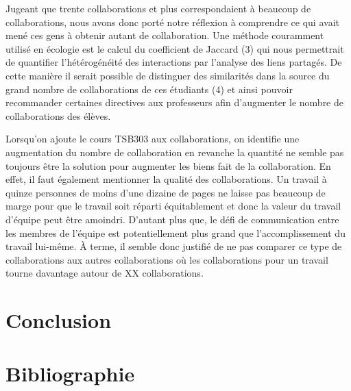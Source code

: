 \documentclass[9pt,twocolumn,twoside,]{pnas-new}
\begin{document}
Jugeant que trente collaborations et plus correspondaient à beaucoup de
collaborations, nous avons donc porté notre réflexion à comprendre ce
qui avait mené ces gens à obtenir autant de collaboration. Une méthode
couramment utilisé en écologie est le calcul du coefficient de Jaccard
(3) qui nous permettrait de quantifier l'hétérogénéité des interactions
par l'analyse des liens partagés. De cette manière il serait possible de
distinguer des similarités dans la source du grand nombre de
collaborations de ces étudiants (4) et ainsi pouvoir recommander
certaines directives aux professeurs afin d'augmenter le nombre de
collaborations des élèves.

Lorsqu'on ajoute le cours TSB303 aux collaborations, on identifie une
augmentation du nombre de collaboration en revanche la quantité ne
semble pas toujours être la solution pour augmenter les biens fait de la
collaboration. En effet, il faut également mentionner la qualité des
collaborations. Un travail à quinze personnes de moins d'une dizaine de
pages ne laisse pas beaucoup de marge pour que le travail soit réparti
équitablement et donc la valeur du travail d'équipe peut être amoindri.
D'autant plus que, le défi de communication entre les membres de
l'équipe est potentiellement plus grand que l'accomplissement du travail
lui-même. À terme, il semble donc justifié de ne pas comparer ce type de
collaborations aux autres collaborations où les collaborations pour un
travail tourne davantage autour de XX collaborations.

\hypertarget{conclusion}{%
\section{Conclusion}\label{conclusion}}

\newpage

\hypertarget{bibliographie}{%
\section*{Bibliographie}\label{bibliographie}}
\end{document}
